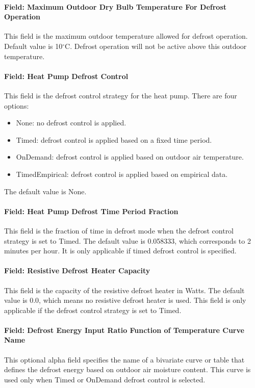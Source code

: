 \paragraph{Field: Maximum Outdoor Dry Bulb Temperature For Defrost Operation}
This field is the maximum outdoor temperature allowed for defrost operation.
Default value is 10$^\circ$C. Defrost operation will not be active above this
outdoor temperature.
\paragraph{Field: Heat Pump Defrost Control} This field is the defrost control
strategy for the heat pump. There are four options:
\begin{itemize} %
    \item None: no defrost control is applied.
    \item Timed: defrost control is applied based on a fixed time period.
    \item OnDemand: defrost control is applied based on outdoor air temperature.
    \item TimedEmpirical: defrost control is applied based on empirical data.
\end{itemize} The default value is None.
\paragraph{Field: Heat Pump Defrost Time Period Fraction} This field is the
fraction of time in defrost mode when the defrost control strategy is set to
Timed. The default value is 0.058333, which corresponds to 2 minutes per hour.
It is only applicable if timed defrost control is specified.
\paragraph{Field: Resistive Defrost Heater Capacity} This field is the capacity
of the resistive defrost heater in Watts. The default value is 0.0, which means
no resistive defrost heater is used. This field is only applicable if the
defrost control strategy is set to Timed.
\paragraph{Field: Defrost Energy Input Ratio Function of Temperature Curve Name}
This optional alpha field specifies the name of a bivariate curve or table that
defines the defrost energy based on outdoor air moisture content. This curve is
used only when Timed or OnDemand defrost control is selected.
